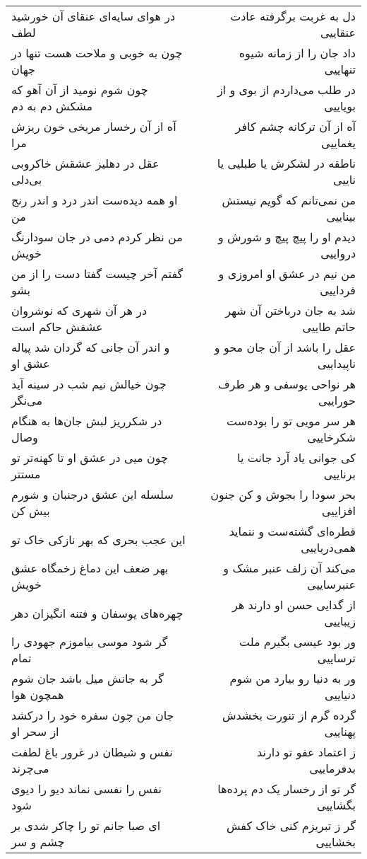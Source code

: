 \begin{center}
\begin{longtable}{l p{0.5cm} r}
در هوای سایه‌ای عنقای آن خورشید لطف
&&
دل به غربت برگرفته عادت عنقاییی
\\
چون به خوبی و ملاحت هست تنها در جهان
&&
داد جان را از زمانه شیوه تنهاییی
\\
چون شوم نومید از آن آهو که مشکش دم به دم
&&
در طلب می‌داردم از بوی و از بویاییی
\\
آه از آن رخسار مریخی خون ریزش مرا
&&
آه از آن ترکانه چشم کافر یغماییی
\\
عقل در دهلیز عشقش خاکروبی بی‌دلی
&&
ناطقه در لشکرش یا طبلیی یا ناییی
\\
او همه دیده‌ست اندر درد و اندر رنج من
&&
من نمی‌تانم که گویم نیستش بیناییی
\\
من نظر کردم دمی در جان سودارنگ خویش
&&
دیدم او را پیچ پیچ و شورش و درواییی
\\
گفتم آخر چیست گفتا دست را از من بشو
&&
من نیم در عشق او امروزی و فرداییی
\\
در هر آن شهری که نوشروان عشقش حاکم است
&&
شد به جان درباختن آن شهر حاتم طاییی
\\
و اندر آن جانی که گردان شد پیاله عشق او
&&
عقل را باشد از آن جان محو و ناپیداییی
\\
چون خیالش نیم شب در سینه آید می‌نگر
&&
هر نواحی یوسفی و هر طرف حوراییی
\\
در شکرریز لبش جان‌ها به هنگام وصال
&&
هر سر مویی تو را بوده‌ست شکرخاییی
\\
چون میی در عشق او تا کهنه‌تر تو مستتر
&&
کی جوانی یاد آرد جانت یا برناییی
\\
سلسله این عشق درجنبان و شورم بیش کن
&&
بحر سودا را بجوش و کن جنون افزاییی
\\
این عجب بحری که بهر نازکی خاک تو
&&
قطره‌ای گشته‌ست و ننماید همی‌دریاییی
\\
بهر ضعف این دماغ زخمگاه عشق خویش
&&
می‌کند آن زلف عنبر مشک و عنبرساییی
\\
چهره‌های یوسفان و فتنه انگیزان دهر
&&
از گدایی حسن او دارند هر زیباییی
\\
گر شود موسی بیاموزم جهودی را تمام
&&
ور بود عیسی بگیرم ملت ترساییی
\\
گر به جانش میل باشد جان شوم همچون هوا
&&
ور به دنیا رو بیارد من شوم دنیاییی
\\
جان من چون سفره خود را درکشد از سحر او
&&
گرده گرم از تنورت بخشدش پهناییی
\\
نفس و شیطان در غرور باغ لطفت می‌چرند
&&
ز اعتماد عفو تو دارند بدفرماییی
\\
نفس را نفسی نماند دیو را دیوی شود
&&
گر تو از رخسار یک دم پرده‌ها بگشاییی
\\
ای صبا جانم تو را چاکر شدی بر چشم و سر
&&
گر ز تبریزم کنی خاک کفش بخشاییی
\\
\end{longtable}
\end{center}
